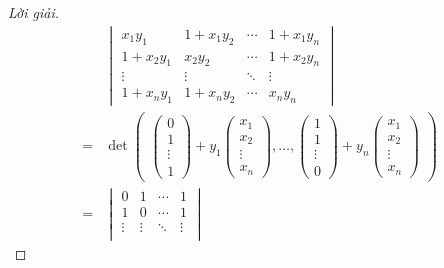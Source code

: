 \documentclass[class=linear-algebra,crop=false]{standalone}
\begin{document}
\begin{proof}[Lời giải]
	\begingroup{}
	\allowdisplaybreaks{}
	\begin{align*}
		  & \begin{vmatrix}
			    x_{1}y_{1}     & 1 + x_{1}y_{2} & \cdots & 1 + x_{1}y_{n} \\
			    1 + x_{2}y_{1} & x_{2}y_{2}     & \cdots & 1 + x_{2}y_{n} \\
			    \vdots         & \vdots         & \ddots & \vdots         \\
			    1 + x_{n}y_{1} & 1 + x_{n}y_{2} & \cdots & x_{n}y_{n}
		    \end{vmatrix}                                                                                     \\
		= &
		\det\begin{pmatrix}
			    \begin{pmatrix}
				0      \\
				1      \\
				\vdots \\
				1
			\end{pmatrix}
			    +
			    y_{1}\begin{pmatrix}
				     x_{1}  \\
				     x_{2}  \\
				     \vdots \\
				     x_{n}
			     \end{pmatrix},
			    \ldots,
			    \begin{pmatrix}
				1      \\
				1      \\
				\vdots \\
				0
			\end{pmatrix}
			    +
			    y_{n}\begin{pmatrix}
				     x_{1}  \\
				     x_{2}  \\
				     \vdots \\
				     x_{n}
			     \end{pmatrix}
		    \end{pmatrix}                                                                                                              \\
		= &
		\begin{vmatrix}
			0      & 1      & \cdots & 1      \\
			1      & 0      & \cdots & 1      \\
			\vdots & \vdots & \ddots & \vdots \\

\end{vmatrix}
\end{align*}
\end{proof}
\end{document}
